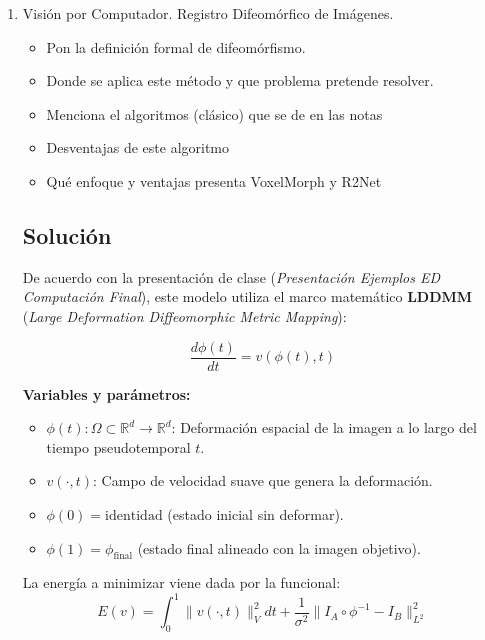 \begin{enumerate}[label=\arabic*., leftmargin=*]
\begin{itemize}[leftmargin=*]
        \item \textbf{¿Qué objetivo tiene?}\\
        Su objetivo principal es aumentar drásticamente la velocidad de transmisión de datos (tasa de transferencia) y la confiabilidad de las conexiones inalámbricas en redes 5G, sin necesidad de consumir espectro radioeléctrico adicional.
    \end{itemize}
    
    \item Visión por Computador. Registro Difeomórfico de Imágenes.
    \begin{itemize}[leftmargin=*]
        \item Pon la definición formal de difeomórfismo.
        \item Donde se aplica este método y que problema pretende resolver.
        \item Menciona el algoritmos (clásico) que se de en las notas
        \item Desventajas de este algoritmo
        \item Qué enfoque y ventajas presenta VoxelMorph y R2Net
    \end{itemize}

    \subsection{Solución}

    De acuerdo con la presentación de clase (\textit{Presentación Ejemplos ED Computación Final}), este modelo utiliza el marco matemático \textbf{LDDMM} (\textit{Large Deformation Diffeomorphic Metric Mapping}):

    \[ \frac{d\phi(t)}{dt} = v(\phi(t), t) \]

    \textbf{Variables y parámetros:}
    \begin{itemize}[leftmargin=*]
        \item $\phi(t): \Omega \subset \mathbb{R}^d \to \mathbb{R}^d$: Deformación espacial de la imagen a lo largo del tiempo pseudotemporal $t$.
        \item $v(\cdot, t)$: Campo de velocidad suave que genera la deformación.
        \item $\phi(0) = \text{identidad}$ (estado inicial sin deformar).
        \item $\phi(1) = \phi_{\text{final}}$ (estado final alineado con la imagen objetivo).
    \end{itemize}

    La energía a minimizar viene dada por la funcional:
    \[ E(v) = \int_{0}^{1} \|v(\cdot, t)\|_V^2 dt + \frac{1}{\sigma^2} \|I_A \circ \phi^{-1} - I_B\|_{L^2}^2 \]


\end{enumerate}
